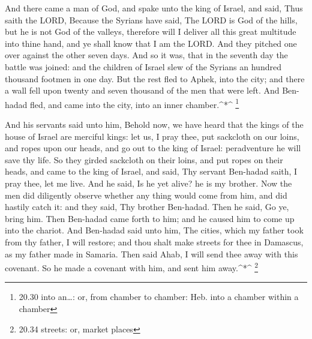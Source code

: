  And there came a man of God, and spake unto the king of
Israel, and said, Thus saith the LORD, Because the Syrians have said,
The LORD is God of the hills, but he is not God of the valleys,
therefore will I deliver all this great multitude into thine hand, and
ye shall know that I am the LORD.  And they pitched one
over against the other seven days. And so it was, that in the seventh
day the battle was joined: and the children of Israel slew of the
Syrians an hundred thousand footmen in one day.  But the
rest fled to Aphek, into the city; and there a wall fell upon twenty and
seven thousand of the men that were left. And Ben-hadad fled, and came
into the city, into an inner chamber.\^{}*\^{} \footnote{20.30 into
  an\ldots: or, from chamber to chamber: Heb. into a chamber within a
  chamber}

 And his servants said unto him, Behold now, we have heard
that the kings of the house of Israel are merciful kings: let us, I pray
thee, put sackcloth on our loins, and ropes upon our heads, and go out
to the king of Israel: peradventure he will save thy life. 
So they girded sackcloth on their loins, and put ropes on their heads,
and came to the king of Israel, and said, Thy servant Ben-hadad saith, I
pray thee, let me live. And he said, Is he yet alive? he is my brother.
 Now the men did diligently observe whether any thing would
come from him, and did hastily catch it: and they said, Thy brother
Ben-hadad. Then he said, Go ye, bring him. Then Ben-hadad came forth to
him; and he caused him to come up into the chariot.  And
Ben-hadad said unto him, The cities, which my father took from thy
father, I will restore; and thou shalt make streets for thee in
Damascus, as my father made in Samaria. Then said Ahab, I will send thee
away with this covenant. So he made a covenant with him, and sent him
away.\^{}*\^{} \footnote{20.34 streets: or, market places}

